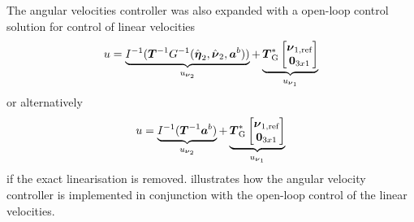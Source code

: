 The angular velocities \abbrPI controller was also expanded with a open-loop control solution for control of linear velocities
\begin{equation}
	u = \underbrace{I^{-1}(\boldsymbol{T}^{-1} G^{-1}(\hat{\etaVector}_2,\hat{\nuVector}_2,\accVector^b))}_{u_{\nuVectorAng}} + \underbrace{\thrusterGeometryOnes[*] \begin{bmatrix}\nuVector_{1,\text{ref}} \\ \zeroCol{3} \end{bmatrix}}_{u_{\nuVectorLin}}	
\end{equation}
or alternatively 
\begin{equation}
	u = \underbrace{I^{-1}(\boldsymbol{T}^{-1} \accVector^b)}_{u_{\nuVectorAng}} + \underbrace{\thrusterGeometryOnes[*] \begin{bmatrix} \nuVector_{1,\text{ref}} \\ \zeroCol{3} \end{bmatrix}}_{u_{\nuVectorLin}}
\end{equation}
if the exact linearisation is removed.  illustrates how the angular velocity controller is implemented in conjunction with the open-loop control of the linear velocities.
